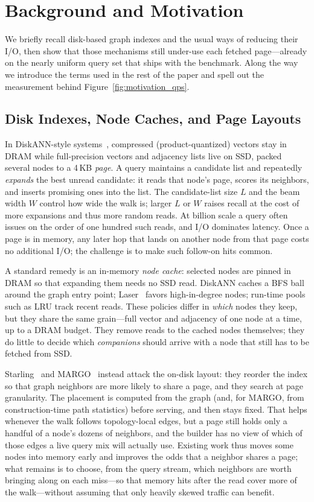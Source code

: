 \section{Background and Motivation}
\label{sec:background}

We briefly recall disk-based graph indexes and the usual ways of reducing their I/O, then show that those mechanisms still under-use each fetched page---already on the nearly uniform query set that ships with the benchmark.
Along the way we introduce the terms used in the rest of the paper and spell out the measurement behind Figure~\ref{fig:motivation_qps}.

\subsection{Disk Indexes, Node Caches, and Page Layouts}
In DiskANN-style systems~\cite{diskann}, compressed (product-quantized) vectors stay in DRAM while full-precision vectors and adjacency lists live on SSD, packed several nodes to a 4\,KB \emph{page}.
A query maintains a candidate list and repeatedly \emph{expands} the best unread candidate: it reads that node's page, scores its neighbors, and inserts promising ones into the list.
The candidate-list size $L$ and the beam width $W$ control how wide the walk is; larger $L$ or $W$ raises recall at the cost of more expansions and thus more random reads.
At billion scale a query often issues on the order of one hundred such reads, and I/O dominates latency.
Once a page is in memory, any later hop that lands on another node from that page costs no additional I/O; the challenge is to make such follow-on hits common.

A standard remedy is an in-memory \emph{node cache}: selected nodes are pinned in DRAM so that expanding them needs no SSD read.
DiskANN caches a BFS ball around the graph entry point; Laser~\cite{laser} favors high-in-degree nodes; run-time pools such as LRU track recent reads.
These policies differ in \emph{which} nodes they keep, but they share the same grain---full vector and adjacency of one node at a time, up to a DRAM budget.
They remove reads to the cached nodes themselves; they do little to decide which \emph{companions} should arrive with a node that still has to be fetched from SSD.

Starling~\cite{starling} and MARGO~\cite{margo} instead attack the on-disk layout: they reorder the index so that graph neighbors are more likely to share a page, and they search at page granularity.
The placement is computed from the graph (and, for MARGO, from construction-time path statistics) before serving, and then stays fixed.
That helps whenever the walk follows topology-local edges, but a page still holds only a handful of a node's dozens of neighbors, and the builder has no view of which of those edges a live query mix will actually use.
Existing work thus moves some nodes into memory early and improves the odds that a neighbor shares a page; what remains is to choose, from the query stream, which neighbors are worth bringing along on each miss---so that memory hits after the read cover more of the walk---without assuming that only heavily skewed traffic can benefit.

